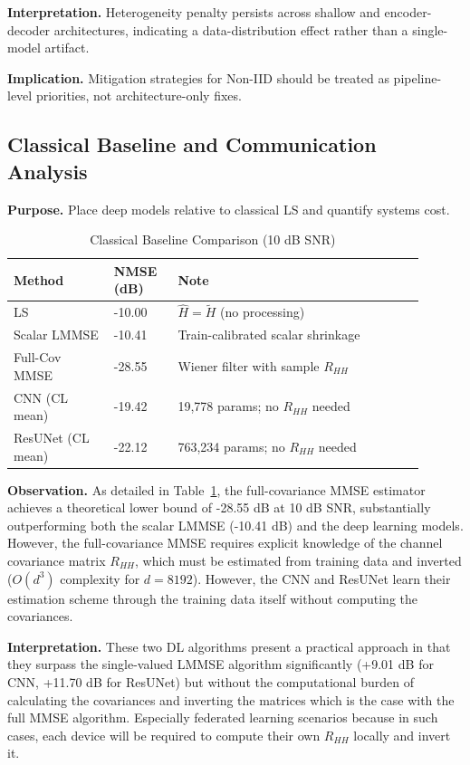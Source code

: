 \documentclass[runningheads]{llncs}
\begin{document}
\noindent\textbf{Interpretation.} Heterogeneity penalty persists across shallow and encoder-decoder architectures, indicating a data-distribution effect rather than a single-model artifact.

\noindent\textbf{Implication.} Mitigation strategies for Non-IID should be treated as pipeline-level priorities, not architecture-only fixes.

\subsection{Classical Baseline and Communication Analysis}
\noindent\textbf{Purpose.} Place deep models relative to classical LS and quantify systems cost.

\begin{table}[htbp]
\caption{Classical Baseline Comparison (10 dB SNR)}
\label{tab:classical}
\centering
\begin{tabular}{p{0.22\linewidth}p{0.14\linewidth}p{0.54\linewidth}}
\toprule
Method & NMSE (dB) & Note \\
\midrule
LS & -10.00 & $\hat{H}=\tilde{H}$ (no processing) \\
Scalar LMMSE & -10.41 & Train-calibrated scalar shrinkage \\
Full-Cov MMSE & -28.55 & Wiener filter with sample $R_{HH}$ \\
\midrule
CNN (CL mean) & -19.42 & 19,778 params; no $R_{HH}$ needed \\
ResUNet (CL mean) & -22.12 & 763,234 params; no $R_{HH}$ needed \\
\bottomrule
\end{tabular}
\end{table}

\noindent\textbf{Observation.} As detailed in Table~\ref{tab:classical}, the full-covariance MMSE estimator achieves a theoretical lower bound of -28.55 dB at 10 dB SNR, substantially outperforming both the scalar LMMSE (-10.41 dB) and the deep learning models. However, the full-covariance MMSE requires explicit knowledge of the channel covariance matrix $R_{HH}$, which must be estimated from training data and inverted ($O(d^3)$ complexity for $d=8192$). However, the CNN and ResUNet learn their estimation scheme through the training data itself without computing the covariances.

\noindent\textbf{Interpretation.} These two DL algorithms present a practical approach in that they surpass the single-valued LMMSE algorithm significantly (+9.01 dB for CNN, +11.70 dB for ResUNet) but without the computational burden of calculating the covariances and inverting the matrices which is the case with the full MMSE algorithm.
Especially federated learning scenarios because in such cases, each device will be required to compute their own $R_{HH}$ locally and invert it.
\end{document}
